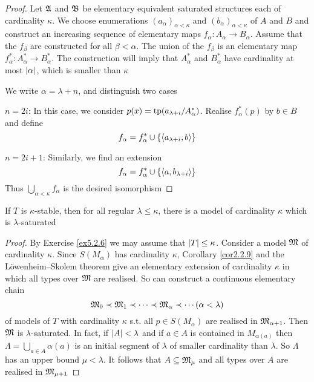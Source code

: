 \documentclass[11pt]{article}
\begin{document}
\begin{proof}
Let \(\mathfrak{A}\) and \(\mathfrak{B}\) be elementary equivalent saturated structures each of cardinality \(\kappa\). We
choose enumerations \((a_\alpha)_{\alpha<\kappa}\) and \((b_\alpha)_{\alpha<\kappa}\) of \(A\) and \(B\) and construct an
increasing sequence of elementary maps \(f_\alpha:A_\alpha\to B_\alpha\). Assume that the \(f_\beta\) are constructed
for all \(\beta<\alpha\). The union of the \(f_\beta\) is an elementary map \(f_\alpha^*:A_\alpha^*\to B_\alpha^*\). The
construction will imply that \(A_\alpha^*\) and \(B_\alpha^*\) have cardinality at most \(\abs{\alpha}\), which
is smaller than \(\kappa\)

We write \(\alpha=\lambda+n\), and distinguish two cases

\(n=2i\): In this case, we consider \(p(x)=\operatorname{tp}(a_{\lambda+i}/A_\alpha^*)\). Realise \(f_\alpha^*(p)\) by \(b\in B\)
and define
\begin{equation*}
f_\alpha=f_\alpha^*\cup\{\langle a_{\lambda+i},b\rangle\}
\end{equation*}

\(n=2i+1\): Similarly, we find an extension
\begin{equation*}
f_\alpha=f_\alpha^*\cup\{\langle a,b_{\lambda+i}\rangle\}
\end{equation*}
Thus \(\bigcup_{\alpha<\kappa}f_\alpha\) is the desired isomorphism
\end{proof}

\begin{lemma}[]
\label{lemma5.2.9}
If \(T\) is \(\kappa\)-stable, then for all regular \(\lambda\le\kappa\), there is a model of cardinality \(\kappa\) which is \(\lambda\)-saturated
\end{lemma}

\begin{proof}
By Exercise \ref{ex5.2.6} we may assume that \(\abs{T}\le\kappa\).  Consider a model \(\mathfrak{M}\) of cardinality
\(\kappa\). Since \(S(M_\alpha)\) has cardinality \(\kappa\), Corollary \ref{cor2.2.9} and the Löwenheim–Skolem theorem
give an elementary extension of cardinality \(\kappa\) in which all types over \(\mathfrak{M}\) are realised. So can
construct a continuous elementary chain
\begin{equation*}
\mathfrak{M}_0\prec\mathfrak{M}_1\prec\dots\prec\mathfrak{M}_\alpha\prec\cdots(\alpha<\lambda)
\end{equation*}
of models of \(T\) with cardinality \(\kappa\) s.t. all \(p\in S(M_\alpha)\) are realised in \(\mathfrak{M}_{\alpha+1}\).
Then \(\mathfrak{M}\) is \(\lambda\)-saturated. In fact, if \(\abs{A}<\lambda\) and if \(a\in A\) is contained in \(M_{\alpha(a)}\)
then \(\Lambda=\bigcup_{a\in A}\alpha(a)\) is an initial segment of \(\lambda\) of smaller cardinality than \(\lambda\). So \(\Lambda\) has an
upper bound \(\mu<\lambda\). It follows that \(A\subseteq\mathfrak{M}_\mu\) and all types over \(A\) are realised in \(\mathfrak{M}_{\mu+1}\)
\end{proof}
\end{document}
